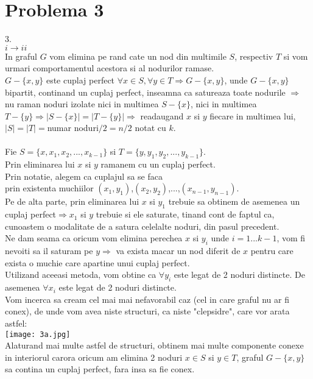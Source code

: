 \documentclass{article}
\begin{document}
\newpage
\section*{Problema 3}
\Large
3.\\
$i \rightarrow ii$\\
In graful $G$ vom elimina pe rand cate un nod din multimile $S$, respectiv $T$ si vom urmari comportamentul acestora si al nodurilor ramase.\\
$G-\{x,y\}$ este cuplaj perfect $\forall x \in S, \forall y \in T \Rightarrow G-\{x,y\}$, unde $G-\{x,y\}$ bipartit, continand un cuplaj perfect, inseamna ca satureaza toate nodurile $\Rightarrow$ nu raman noduri izolate nici in multimea $S-\{x\}$, nici in multimea $T-\{y\} \Rightarrow |S-\{x\}|=|T-\{y\}| \Rightarrow$ readaugand $x$ si $y$ fiecare in multimea lui, $|S|=|T|=$numar noduri$/2 = n/2$ notat cu $k$.   \\
\bigskip\\
Fie $S=\{ x,x_1,x_2,...,x_{k-1} \} $ si $T=\{ y,y_1,y_2,...,y_{k-1} \}$.\\
Prin eliminarea lui $x$ si $y$ ramanem cu un cuplaj perfect.\\
Prin notatie, alegem ca cuplajul sa se faca \\
prin existenta muchiilor $(x_1,y_1)$,$(x_2,y_2)$,...,$(x_{n-1},y_{n-1})$.\\
Pe de alta parte, prin eliminarea lui $x$ si $y_1$ trebuie sa obtinem de asemenea un cuplaj perfect$\Rightarrow x_1$ si $y$ trebuie si ele saturate, tinand cont de faptul ca, cunoastem o modalitate de a satura celelalte noduri, din pasul precedent.\\
Ne dam seama ca oricum vom elimina perechea $x$ si $y_i$ unde $i=1...k-1$, vom fi nevoiti sa il saturam pe $y\Rightarrow$ va exista macar un nod diferit de $x$ pentru care exista o muchie care apartine unui cuplaj perfect. \\
Utilizand aceeasi metoda, vom obtine ca $\forall y_i$ este legat de 2 noduri distincte. De asemenea $\forall x_i$ este legat de 2 noduri distincte.\\
Vom incerca sa cream cel mai mai nefavorabil caz (cel in care graful nu ar fi conex), de unde vom avea niste structuri, ca niste "clepsidre", care vor arata astfel:\\
 \texttt{[image: 3a.jpg]}\\
 Alaturand mai multe astfel de structuri, obtinem mai multe componente conexe in interiorul carora oricum am elimina 2 noduri $x \in S$ si $y \in T$, graful $G-\{x,y\}$ sa contina un cuplaj perfect, fara insa sa fie conex.\\
\end{document}
